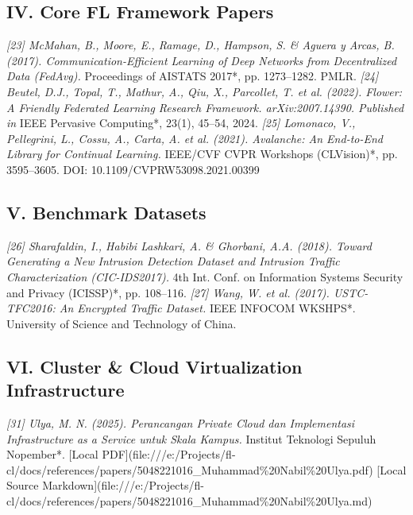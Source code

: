 \documentclass[conference]{IEEEtran}
\begin{document}
\subsection{IV. Core FL Framework Papers}
\textit{ [23] McMahan, B., Moore, E., Ramage, D., Hampson, S. \& Aguera y Arcas, B. (2017). Communication-Efficient Learning of Deep Networks from Decentralized Data (FedAvg). }Proceedings of AISTATS 2017*, pp. 1273–1282. PMLR.
\textit{ [24] Beutel, D.J., Topal, T., Mathur, A., Qiu, X., Parcollet, T. et al. (2022). Flower: A Friendly Federated Learning Research Framework. arXiv:2007.14390. Published in }IEEE Pervasive Computing*, 23(1), 45–54, 2024.
\textit{ [25] Lomonaco, V., Pellegrini, L., Cossu, A., Carta, A. et al. (2021). Avalanche: An End-to-End Library for Continual Learning. }IEEE/CVF CVPR Workshops (CLVision)*, pp. 3595–3605. DOI: 10.1109/CVPRW53098.2021.00399


\subsection{V. Benchmark Datasets}
\textit{ [26] Sharafaldin, I., Habibi Lashkari, A. \& Ghorbani, A.A. (2018). Toward Generating a New Intrusion Detection Dataset and Intrusion Traffic Characterization (CIC-IDS2017). }4th Int. Conf. on Information Systems Security and Privacy (ICISSP)*, pp. 108–116.
\textit{ [27] Wang, W. et al. (2017). USTC-TFC2016: An Encrypted Traffic Dataset. }IEEE INFOCOM WKSHPS*. University of Science and Technology of China.


\subsection{VI. Cluster & Cloud Virtualization Infrastructure}
\textit{ [31] Ulya, M. N. (2025). Perancangan Private Cloud dan Implementasi Infrastructure as a Service untuk Skala Kampus. }Institut Teknologi Sepuluh Nopember*. [Local PDF](file:///e:/Projects/fl-cl/docs/references/papers/5048221016\_Muhammad\%20Nabil\%20Ulya.pdf) [Local Source Markdown](file:///e:/Projects/fl-cl/docs/references/papers/5048221016\_Muhammad\%20Nabil\%20Ulya.md)
\end{document}
